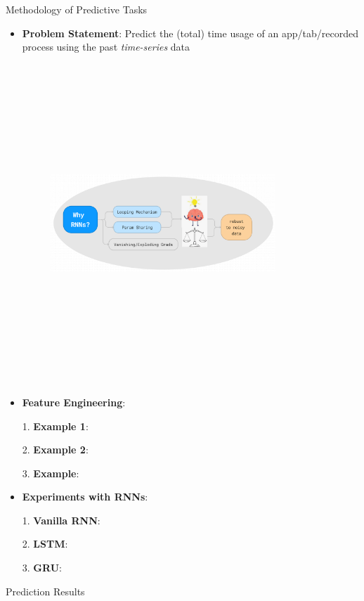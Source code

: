 \documentclass[final]{beamer}
\newlength{\colwidth}
\begin{document}
\begin{frame}[t]
\begin{columns}[t]
\begin{column}{\colwidth}
\begin{exampleblock}{Methodology of Predictive Tasks}

    \begin{itemize}
       \item \textbf{Problem Statement}: Predict the (total) time usage of an app/tab/recorded process using the past \textit{time-series} data
       \begin{figure}\includegraphics[width=0.8\textwidth, height=12cm]{Why_RNN.PNG}\end{figure}

       \item \textbf{Feature Engineering}:
       
       1. \textbf{Example 1}:

       2. \textbf{Example 2}:
       
       3. \textbf{Example}:
       
       \item \textbf{Experiments with RNNs}:
       
       1. \textbf{Vanilla RNN}: 

       2. \textbf{LSTM}:
       
       3. \textbf{GRU}:




      \end{itemize}
    \end{exampleblock}

    \begin{block}{Prediction Results}


\end{block}
\end{column}
\end{columns}
\end{frame}
\end{document}
